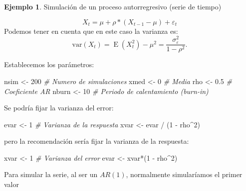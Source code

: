 \documentclass[
]{book}
\newenvironment{Shaded}{\begin{snugshade}}{\end{snugshade}}
\newcommand{\CommentTok}[1]{\textcolor[rgb]{0.56,0.35,0.01}{\textit{#1}}}
\newcommand{\DecValTok}[1]{\textcolor[rgb]{0.00,0.00,0.81}{#1}}
\newcommand{\FloatTok}[1]{\textcolor[rgb]{0.00,0.00,0.81}{#1}}
\newcommand{\NormalTok}[1]{#1}
\newcommand{\OtherTok}[1]{\textcolor[rgb]{0.56,0.35,0.01}{#1}}
\newcommand{\SpecialCharTok}[1]{\textcolor[rgb]{0.00,0.00,0.00}{#1}}
\theoremstyle{break}
\theoremstyle{definition}
\theoremstyle{definition}
\newtheorem{example}{Ejemplo}[chapter]
\theoremstyle{definition}
\theoremstyle{definition}
\theoremstyle{remark}
\begin{document}
\begin{example}
\protect\hypertarget{exm:unnamed-chunk-18}{}{\label{exm:unnamed-chunk-18} }Simulación de un proceso autorregresivo (serie de tiempo)
\end{example}

\[X_t = \mu + \rho * (X_{t-1} - \mu) + \varepsilon_t\]
Podemos tener en cuenta que en este caso la varianza es:
\[\textrm{var}(X_t)=\operatorname{E}(X_t^2)-\mu^2=\frac{\sigma_\varepsilon^2}{1-\rho^2}.\]

Establecemos los parámetros:

\begin{Shaded}
\begin{Highlighting}[]
\NormalTok{nsim }\OtherTok{\textless{}{-}} \DecValTok{200}   \CommentTok{\# Numero de simulaciones}
\NormalTok{xmed }\OtherTok{\textless{}{-}} \DecValTok{0}     \CommentTok{\# Media}
\NormalTok{rho }\OtherTok{\textless{}{-}} \FloatTok{0.5}    \CommentTok{\# Coeficiente AR}
\NormalTok{nburn }\OtherTok{\textless{}{-}} \DecValTok{10}   \CommentTok{\# Periodo de calentamiento (burn{-}in)}
\end{Highlighting}
\end{Shaded}

Se podría fijar la varianza del error:

\begin{Shaded}
\begin{Highlighting}[]
\NormalTok{evar }\OtherTok{\textless{}{-}} \DecValTok{1}
\CommentTok{\# Varianza de la respuesta}
\NormalTok{xvar }\OtherTok{\textless{}{-}}\NormalTok{ evar }\SpecialCharTok{/}\NormalTok{ (}\DecValTok{1} \SpecialCharTok{{-}}\NormalTok{ rho}\SpecialCharTok{\^{}}\DecValTok{2}\NormalTok{)}
\end{Highlighting}
\end{Shaded}

pero la recomendación sería fijar la varianza de la respuesta:

\begin{Shaded}
\begin{Highlighting}[]
\NormalTok{xvar }\OtherTok{\textless{}{-}} \DecValTok{1}     
\CommentTok{\# Varianza del error}
\NormalTok{evar }\OtherTok{\textless{}{-}}\NormalTok{ xvar}\SpecialCharTok{*}\NormalTok{(}\DecValTok{1} \SpecialCharTok{{-}}\NormalTok{ rho}\SpecialCharTok{\^{}}\DecValTok{2}\NormalTok{)}
\end{Highlighting}
\end{Shaded}

Para simular la serie, al ser un \(AR(1)\), normalmente simularíamos el primer valor
\end{document}
